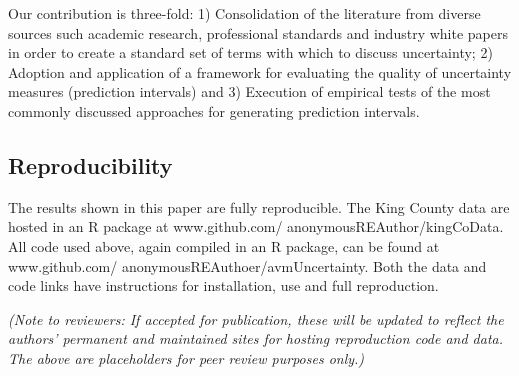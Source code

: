 \documentclass[colTwo]{anon}
\theoremstyle{definition}
\begin{document}
Our contribution is three-fold: 1) Consolidation of the literature from diverse sources such academic research, professional standards and industry white papers in order to create a standard set of terms with which to discuss uncertainty; 2) Adoption and application of a framework for evaluating the quality of uncertainty measures (prediction intervals) and 3) Execution of empirical tests of the most commonly discussed approaches for generating prediction intervals.  

\subsection{Reproducibility}

The results shown in this paper are fully reproducible.  The King County data are hosted in an R package at www.github.com/ anonymousREAuthor/kingCoData.  All code used above, again compiled in an R package, can be found at www.github.com/ anonymousREAuthoer/avmUncertainty.  Both the data and code links have instructions for installation, use and full reproduction.   

\textit{(Note to reviewers: If accepted for publication, these will be updated to reflect the authors’ permanent and maintained sites for hosting reproduction code and data. The above are placeholders for peer review purposes only.)}
\end{document}
